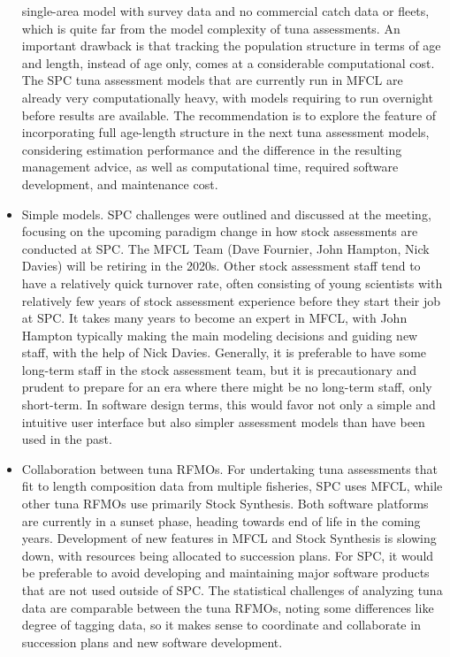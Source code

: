 \documentclass{SCreport}
\begin{document}
\begin{itemize}
  single-area model with survey data and no commercial catch data or fleets,
  which is quite far from the model complexity of tuna assessments. An important
  drawback is that tracking the population structure in terms of age and length,
  instead of age only, comes at a considerable computational cost. The SPC tuna
  assessment models that are currently run in MFCL are already very
  computationally heavy, with models requiring to run overnight before results
  are available. The recommendation is to explore the feature of incorporating
  full age-length structure in the next tuna assessment models, considering
  estimation performance and the difference in the resulting management advice,
  as well as computational time, required software development, and maintenance
  cost.
  \item Simple models. SPC challenges were outlined and discussed at the
  meeting, focusing on the upcoming paradigm change in how stock assessments are
  conducted at SPC. The MFCL Team (Dave Fournier, John Hampton, Nick Davies)
  will be retiring in the 2020s. Other stock assessment staff tend to have a
  relatively quick turnover rate, often consisting of young scientists with
  relatively few years of stock assessment experience before they start their
  job at SPC. It takes many years to become an expert in MFCL, with John Hampton
  typically making the main modeling decisions and guiding new staff, with the
  help of Nick Davies. Generally, it is preferable to have some long-term staff
  in the stock assessment team, but it is precautionary and prudent to prepare
  for an era where there might be no long-term staff, only short-term. In
  software design terms, this would favor not only a simple and intuitive user
  interface but also simpler assessment models than have been used in the past.
  \item Collaboration between tuna RFMOs.\label{item:collaboration-rfmos} For
  undertaking tuna assessments that fit to length composition data from multiple
  fisheries, SPC uses MFCL, while other tuna RFMOs use primarily Stock
  Synthesis. Both software platforms are currently in a sunset phase, heading
  towards end of life in the coming years. Development of new features in MFCL
  and Stock Synthesis is slowing down, with resources being allocated to
  succession plans. For SPC, it would be preferable to avoid developing and
  maintaining major software products that are not used outside of SPC. The
  statistical challenges of analyzing tuna data are comparable between the tuna
  RFMOs, noting some differences like degree of tagging data, so it makes sense
  to coordinate and collaborate in succession plans and new software
  development.
\end{itemize}
\end{document}
